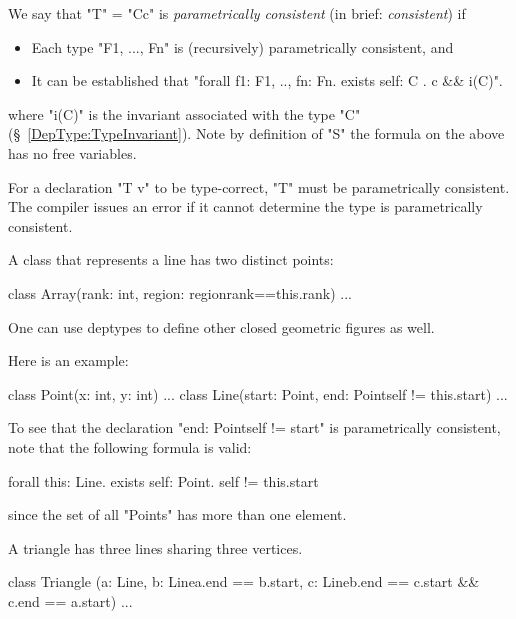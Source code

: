 We say that \xcd"T" = \xcd"C{c}" is {\em parametrically consistent} (in brief:
{\em consistent}) if

\begin{itemize}
  \item Each type \xcd"F1, ..., Fn" is (recursively) parametrically consistent, and
\item It can be established that \xcd"forall f1: F1, .., fn: Fn.  exists self: C . c && i(C)".
\end{itemize}
\noindent where \xcd"i(C)" is the invariant associated with the type \xcd"C"
(\S~\ref{DepType:TypeInvariant}).  Note by definition of \xcd"S" the formula on the
above has no free variables.

\begin{staticrule*}
For a declaration \xcd"T v" to be type-correct, \xcd"T" must be parametrically
consistent. The compiler issues an error if it cannot determine
the type is parametrically consistent.
\end{staticrule*}

\begin{example}

A class that represents a line has two distinct points:
\begin{xten}
class Array(rank: int, 
            region: region{rank==this.rank}) {...}  
\end{xten}
\end{example}

One can use deptypes to define other closed geometric figures as well.

\begin{example}
Here is an example:
\begin{xten}
class Point(x: int, y: int) {...}
class Line(start: Point, 
          end: Point{self != this.start}) 
{...}      
\end{xten}
\end{example}


To see that the declaration \xcd"end: Point{self != start}" is
parametrically consistent, note that the following formula is valid:
\begin{xten}
forall this: Line. 
  exists self: Point. self != this.start  
\end{xten}
\noindent since the set of all \xcd"Points" has more than one element.

\begin{example}
A triangle has three lines sharing three vertices.
\begin{xten}
class Triangle 
 (a: Line, 
  b: Line{a.end == b.start}, 
  c: Line{b.end == c.start && c.end == a.start}) 
 { ... }
\end{xten}
\end{example}



